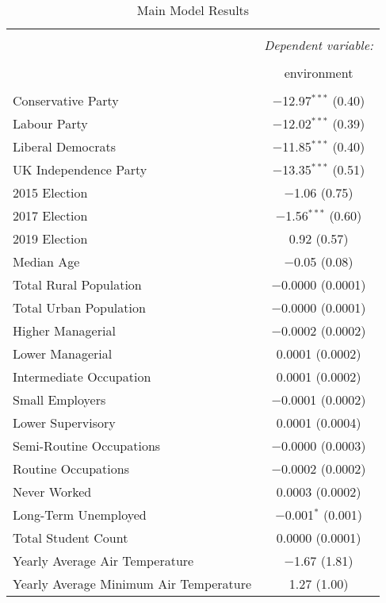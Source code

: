 \documentclass[12pt,letterpaper]{article}
\begin{document}
\begin{table}[!htbp] \centering 
	\caption{Main Model Results} 
	\label{tab:main_model} 
	\footnotesize 
	\begin{tabular}{@{\extracolsep{5pt}}lc} 
		\\[-1.8ex]\hline 
		\hline \\[-1.8ex] 
		& \multicolumn{1}{c}{\textit{Dependent variable:}} \\ 
		\cline{2-2} 
		\\[-1.8ex] & environment \\ 
		\hline \\[-1.8ex] 
		Conservative Party & $-$12.97$^{***}$ (0.40) \\ 
		Labour Party & $-$12.02$^{***}$ (0.39) \\ 
		Liberal Democrats & $-$11.85$^{***}$ (0.40) \\ 
		UK Independence Party & $-$13.35$^{***}$ (0.51) \\ 
		2015 Election & $-$1.06 (0.75) \\ 
		2017 Election & $-$1.56$^{***}$ (0.60) \\ 
		2019 Election & 0.92 (0.57) \\ 
		Median Age & $-$0.05 (0.08) \\ 
		Total Rural Population & $-$0.0000 (0.0001) \\ 
		Total Urban Population & $-$0.0000 (0.0001) \\ 
		Higher Managerial& $-$0.0002 (0.0002) \\ 
		Lower Managerial & 0.0001 (0.0002) \\ 
		Intermediate Occupation & 0.0001 (0.0002) \\ 
		Small Employers & $-$0.0001 (0.0002) \\ 
		Lower Supervisory & 0.0001 (0.0004) \\ 
		Semi-Routine Occupations& $-$0.0000 (0.0003) \\ 
		Routine Occupations & $-$0.0002 (0.0002) \\ 
		Never Worked & 0.0003 (0.0002) \\ 
		Long-Term Unemployed & $-$0.001$^{*}$ (0.001) \\ 
		Total Student Count & 0.0000 (0.0001) \\ 
		Yearly Average Air Temperature & $-$1.67 (1.81) \\ 
		Yearly Average Minimum Air Temperature & 1.27 (1.00) \\ 

\end{tabular}
\end{table}
\end{document}
